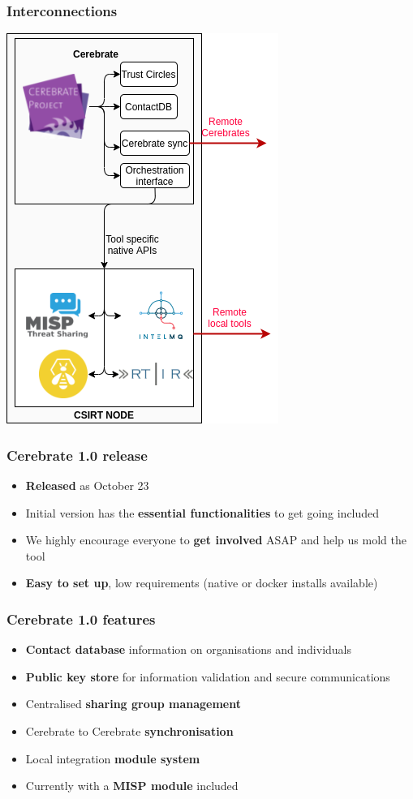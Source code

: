 \begin{frame}
\frametitle{Interconnections}
\includegraphics[scale=0.4]{objectives.png}
\end{frame}

\begin{frame}
	\frametitle{Cerebrate 1.0 release}
	\begin{itemize}
                \item {\bf Released} as October 23
                \item Initial version has the {\bf essential functionalities} to get going included
                \item We highly encourage everyone to {\bf get involved} ASAP and help us mold the tool
                \item {\bf Easy to set up}, low requirements (native or docker installs available)
	\end{itemize}
\end{frame}

\begin{frame}
	\frametitle{Cerebrate 1.0 features}
	\begin{itemize}
            \item {\bf Contact database} \- information on organisations and individuals
            \item {\bf Public key store} for information validation and secure communications
            \item Centralised {\bf sharing group management}
            \item Cerebrate to Cerebrate {\bf synchronisation}
            \item Local integration {\bf module system}
            \item Currently with a {\bf MISP module} included
	\end{itemize}
\end{frame}


